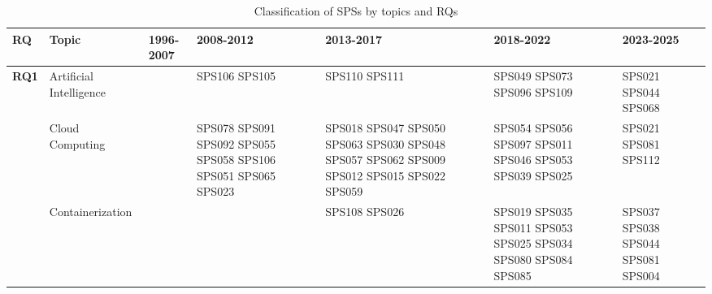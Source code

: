 \begin{table*}[htbp]
	\centering
	\caption{Classification of SPSs by topics and RQs}
	\label{table:sps_classification_by_topic_rq}
	\renewcommand{\arraystretch}{1.2}
	\setlength{\tabcolsep}{6pt}
	\begin{tabularx}{\textwidth}{p{0.8cm}p{2.5cm}>{\raggedright\arraybackslash}X>{\raggedright\arraybackslash}X>{\raggedright\arraybackslash}X>{\raggedright\arraybackslash}X>{\raggedright\arraybackslash}X}
		\toprule
		\textbf{RQ}                           & \textbf{Topic}          & \textbf{1996-2007}                                      & \textbf{2008-2012}                                                                                                            & \textbf{2013-2017}                                                                         & \textbf{2018-2022}                                                                  & \textbf{2023-2025}                 \\
		\midrule
		\multirow{12}{*}[-11em]{\textbf{RQ1}} & Artificial Intelligence &                                                         & SPS106 SPS105                                                                                                                 & SPS110 SPS111                                                                              & SPS049 SPS073 SPS096 SPS109                                                         & SPS021 SPS044 SPS068               \\
		\addlinespace[0.3em]
		                                      & Cloud Computing         &                                                         & SPS078 SPS091 SPS092 SPS055 SPS058 SPS106 SPS051 SPS065 SPS023                                                                & SPS018 SPS047 SPS050 SPS063 SPS030 SPS048 SPS057 SPS062 SPS009 SPS012 SPS015 SPS022 SPS059 & SPS054 SPS056 SPS097 SPS011 SPS046 SPS053 SPS039 SPS025                             & SPS021 SPS081 SPS112               \\
		\addlinespace[0.3em]
		                                      & Containerization        &                                                         &                                                                                                                               & SPS108 SPS026                                                                              & SPS019 SPS035 SPS011 SPS053 SPS025 SPS034 SPS080 SPS084 SPS085                      & SPS037 SPS038 SPS044 SPS081 SPS004 \\

\end{tabularx}
\end{table*}
